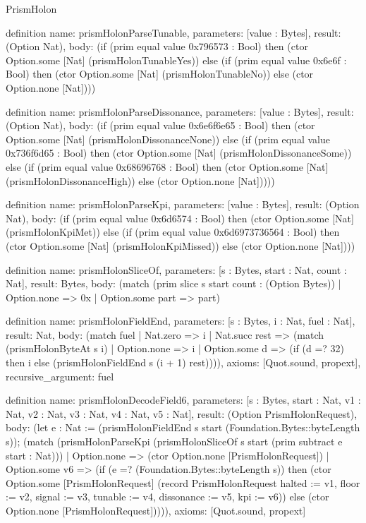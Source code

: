 \begin{lexlean}{PrismHolon}
\begin{semanticmodule}
definition{
  name: prismHolonParseTunable,
  parameters: [value : Bytes],
  result: (Option Nat),
  body: (if (prim equal value 0x796573 : Bool) then (ctor Option.some [Nat] (prismHolonTunableYes)) else (if (prim equal value 0x6e6f : Bool) then (ctor Option.some [Nat] (prismHolonTunableNo)) else (ctor Option.none [Nat])))
}

definition{
  name: prismHolonParseDissonance,
  parameters: [value : Bytes],
  result: (Option Nat),
  body: (if (prim equal value 0x6e6f6e65 : Bool) then (ctor Option.some [Nat] (prismHolonDissonanceNone)) else (if (prim equal value 0x736f6d65 : Bool) then (ctor Option.some [Nat] (prismHolonDissonanceSome)) else (if (prim equal value 0x68696768 : Bool) then (ctor Option.some [Nat] (prismHolonDissonanceHigh)) else (ctor Option.none [Nat]))))
}

definition{
  name: prismHolonParseKpi,
  parameters: [value : Bytes],
  result: (Option Nat),
  body: (if (prim equal value 0x6d6574 : Bool) then (ctor Option.some [Nat] (prismHolonKpiMet)) else (if (prim equal value 0x6d6973736564 : Bool) then (ctor Option.some [Nat] (prismHolonKpiMissed)) else (ctor Option.none [Nat])))
}

definition{
  name: prismHolonSliceOf,
  parameters: [s : Bytes, start : Nat, count : Nat],
  result: Bytes,
  body: (match (prim slice s start count : (Option Bytes))
    | Option.none => 0x
    | Option.some part => part)
}

definition{
  name: prismHolonFieldEnd,
  parameters: [s : Bytes, i : Nat, fuel : Nat],
  result: Nat,
  body: (match fuel
    | Nat.zero => i
    | Nat.succ rest => (match (prismHolonByteAt s i)
      | Option.none => i
      | Option.some d => (if (d =? 32) then i else (prismHolonFieldEnd s (i + 1) rest)))),
  axioms: [Quot.sound, propext],
  recursive_argument: fuel
}

definition{
  name: prismHolonDecodeField6,
  parameters: [s : Bytes, start : Nat, v1 : Nat, v2 : Nat, v3 : Nat, v4 : Nat, v5 : Nat],
  result: (Option PrismHolonRequest),
  body: (let e : Nat := (prismHolonFieldEnd s start (Foundation.Bytes::byteLength s)); (match (prismHolonParseKpi (prismHolonSliceOf s start (prim subtract e start : Nat)))
    | Option.none => (ctor Option.none [PrismHolonRequest])
    | Option.some v6 => (if (e =? (Foundation.Bytes::byteLength s)) then (ctor Option.some [PrismHolonRequest] (record PrismHolonRequest {halted := v1, floor := v2, signal := v3, tunable := v4, dissonance := v5, kpi := v6})) else (ctor Option.none [PrismHolonRequest])))),
  axioms: [Quot.sound, propext]
}


\end{semanticmodule}
\end{lexlean}
